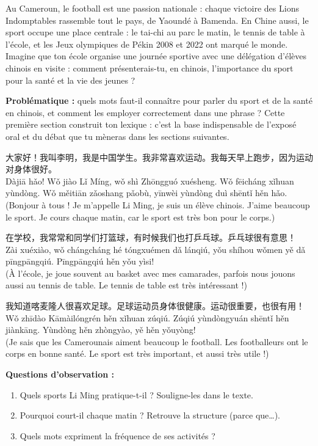 \documentclass[11pt]{article}
\newcommand{\zh}[1]{\ifmmode\text{#1}\else{#1}\fi}
\begin{document}
Au Cameroun, le football est une passion nationale : chaque victoire des Lions Indomptables rassemble tout le pays, de Yaoundé à Bamenda. En Chine aussi, le sport occupe une place centrale : le tai-chi au parc le matin, le tennis de table à l'école, et les Jeux olympiques de Pékin 2008 et 2022 ont marqué le monde. Imagine que ton école organise une journée sportive avec une délégation d'élèves chinois en visite : comment présenterais-tu, en chinois, l'importance du sport pour la santé et la vie des jeunes ?

\textbf{Problématique :} quels mots faut-il connaître pour parler du sport et de la santé en chinois, et comment les employer correctement dans une phrase ? Cette première section construit ton lexique : c'est la base indispensable de l'exposé oral et du débat que tu mèneras dans les sections suivantes.

\begin{textebox}
大家好！我叫李明，我是中国学生。我非常喜欢运动。我每天早上跑步，因为运动对身体很好。\\
Dàjiā hǎo! Wǒ jiào Lǐ Míng, wǒ shì Zhōngguó xuésheng. Wǒ fēicháng xǐhuan yùndòng. Wǒ měitiān zǎoshang pǎobù, yīnwèi yùndòng duì shēntǐ hěn hǎo.\\
(Bonjour à tous ! Je m'appelle Li Ming, je suis un élève chinois. J'aime beaucoup le sport. Je cours chaque matin, car le sport est très bon pour le corps.)

在学校，我常常和同学们打篮球，有时候我们也打乒乓球。乒乓球很有意思！\\
Zài xuéxiào, wǒ chángcháng hé tóngxuémen dǎ lánqiú, yǒu shíhou wǒmen yě dǎ pīngpāngqiú. Pīngpāngqiú hěn yǒu yìsi!\\
(À l'école, je joue souvent au basket avec mes camarades, parfois nous jouons aussi au tennis de table. Le tennis de table est très intéressant !)

我知道喀麦隆人很喜欢足球。足球运动员身体很健康。运动很重要，也很有用！\\
Wǒ zhīdào Kāmàilóngrén hěn xǐhuan zúqiú. Zúqiú yùndòngyuán shēntǐ hěn jiànkāng. Yùndòng hěn zhòngyào, yě hěn yǒuyòng!\\
(Je sais que les Camerounais aiment beaucoup le football. Les footballeurs ont le corps en bonne santé. Le sport est très important, et aussi très utile !)
\end{textebox}

\textbf{Questions d'observation :}
\begin{enumerate}
\item Quels sports Li Ming pratique-t-il ? Souligne-les dans le texte.
\item Pourquoi court-il chaque matin ? Retrouve la structure \zh{因为……} (parce que…).
\item Quels mots expriment la fréquence de ses activités ?
\end{enumerate}
\end{document}
